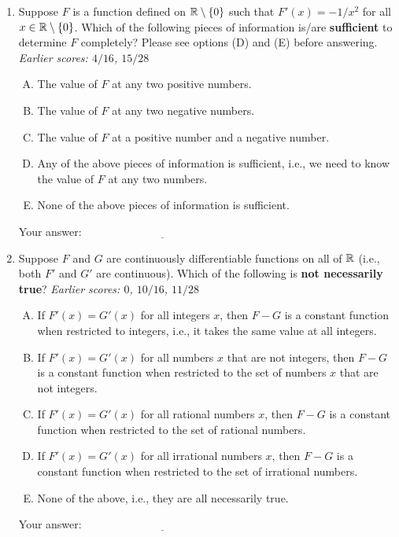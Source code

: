 \documentclass[10pt]{amsart}
\begin{document}
\begin{enumerate}
\item Suppose $F$ is a function defined on $\mathbb{R} \setminus \{ 0 \}$ such
  that $F'(x) = -1/x^2$ for all $x \in \mathbb{R} \setminus \{ 0 \}$. Which of
  the following pieces of information is/are {\bf sufficient} to
  determine $F$ completely? Please see options (D) and (E) before
  answering. {\em Earlier scores: $4/16$, $15/28$}
  \begin{enumerate}[(A)]
  \item The value of $F$ at any two positive numbers.
  \item The value of $F$ at any two negative numbers.
  \item The value of $F$ at a positive number and a negative number.
  \item Any of the above pieces of information is sufficient, i.e., we
    need to know the value of $F$ at any two numbers.
  \item None of the above pieces of information is sufficient.
  \end{enumerate}

  \vspace{0.05in}
  Your answer: $\underline{\qquad\qquad\qquad\qquad\qquad\qquad\qquad}$
  \vspace{0.05in}

\item Suppose $F$ and $G$ are continuously differentiable functions on
  all of $\mathbb{R}$ (i.e., both $F'$ and $G'$ are continuous). Which of the
  following is {\bf not necessarily true}? {\em Earlier scores: $0$,
  $10/16$, $11/28$}

  \begin{enumerate}[(A)]
  \item If $F'(x) = G'(x)$ for all integers $x$, then $F - G$ is a
    constant function when restricted to integers, i.e., it takes the
    same value at all integers.
  \item If $F'(x) = G'(x)$ for all numbers $x$ that are not integers,
    then $F - G$ is a constant function when restricted to the set of
    numbers $x$ that are not integers.
  \item If $F'(x) = G'(x)$ for all rational numbers $x$, then $F - G$
    is a constant function when restricted to the set of rational
    numbers.
  \item If $F'(x) = G'(x)$ for all irrational numbers $x$, then $F -
    G$ is a constant function when restricted to the set of irrational
    numbers.
  \item None of the above, i.e., they are all necessarily true.
  \end{enumerate}
  
  \vspace{0.05in}
  Your answer: $\underline{\qquad\qquad\qquad\qquad\qquad\qquad\qquad}$
  \vspace{0.05in}
\end{enumerate}
\end{document}

